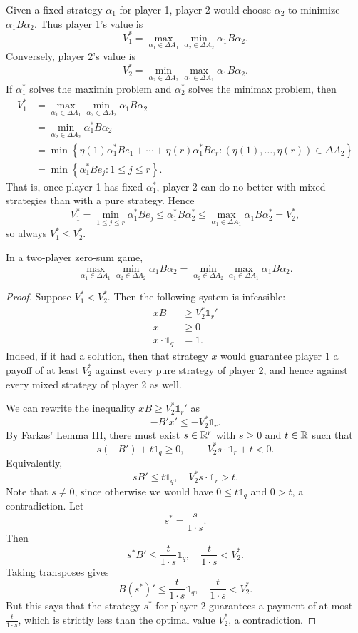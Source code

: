 Given a fixed strategy $\alpha_1$ for player 1, player 2 would choose $\alpha_2$ to minimize $\alpha_1 B \alpha_2$. Thus player 1's value is
\[
	V_1^* = \max_{\alpha_1 \in \Delta A_1} \min_{\alpha_2 \in \Delta A_2} \alpha_1 B \alpha_2
.\]
Conversely, player 2's value is
\[
	V_2^* = \min_{\alpha_2 \in \Delta A_2} \max_{\alpha_1 \in \Delta A_1} \alpha_1 B \alpha_2
.\]
If $\alpha_1^*$ solves the maximin problem and $\alpha_2^*$ solves the minimax problem, then
\begin{align*}
	V_1^*
	&= \max_{\alpha_1 \in \Delta A_1} \min_{\alpha_2 \in \Delta A_2} \alpha_1 B \alpha_2 \\
	&= \min_{\alpha_2 \in \Delta A_2} \alpha_1^* B \alpha_2 \\
	&= \min\left\{\eta(1)\alpha_1^* B e_1 + \cdots + \eta(r)\alpha_1^* B e_r : \left(\eta(1),\ldots,\eta(r)\right) \in \Delta A_2\right\} \\
	&= \min\left\{\alpha_1^* B e_j : 1 \le j \le r\right\}
.\end{align*}
That is, once player 1 has fixed $\alpha_1^*$, player 2 can do no better with mixed strategies than with a pure strategy. Hence
\[
	V_1^*
	= \min_{1\le j\le r} \alpha_1^* B e_j
	\le \alpha_1^* B \alpha_2^*
	\le \max_{\alpha_1 \in \Delta A_1} \alpha_1 B \alpha_2^*
	= V_2^*
,\]
so always $V_1^* \le V_2^*$.
\begin{theorem}[Minimax]
	In a two-player zero-sum game, \[
		\max_{\alpha_1 \in \Delta A_1} \min_{\alpha_2 \in \Delta A_2} \alpha_1 B \alpha_2
		=
		\min_{\alpha_2 \in \Delta A_2} \max_{\alpha_1 \in \Delta A_1} \alpha_1 B \alpha_2
	.\] 
\end{theorem}
\begin{proof}
	Suppose $V_1^* < V_2^*$. Then the following system is infeasible:
	\begin{align*}
		xB &\ge V_2^* \mathds{1}_r' \\
		x &\ge 0 \\
		x \cdot \mathds{1}_q &= 1
	.\end{align*}
	Indeed, if it had a solution, then that strategy $x$ would guarantee player 1 a payoff of at least $V_2^*$ against every pure strategy of player 2, and hence against every mixed strategy of player 2 as well.

	We can rewrite the inequality $xB \ge V_2^* \mathds{1}_r'$ as
	\[
		-B'x' \le -V_2^* \mathds{1}_r
	.\]
	By Farkas' Lemma III, there must exist $s \in \mathbb{R}^r$ with $s \ge 0$ and $t \in \mathbb{R}$ such that
	\[
		s(-B') + t\mathds{1}_q \ge 0, \quad -V_2^* s \cdot \mathds{1}_r + t < 0
	.\]
	Equivalently,
	\[
		sB' \le t\mathds{1}_q, \quad V_2^* s \cdot \mathds{1}_r > t
	.\]
	Note that $s \ne 0$, since otherwise we would have $0 \le t\mathds{1}_q$ and $0 > t$, a contradiction. Let
	\[
		s^* = \frac{s}{1 \cdot s}
	.\]
	Then
	\[
		s^* B' \le \frac{t}{1 \cdot s} \mathds{1}_q, \quad \frac{t}{1 \cdot s} < V_2^*
	.\]
	Taking transposes gives
	\[
		B(s^*)' \le \frac{t}{1 \cdot s} \mathds{1}_q, \quad \frac{t}{1 \cdot s} < V_2^*
	.\]
	But this says that the strategy $s^*$ for player 2 guarantees a payment of at most $\frac{t}{1 \cdot s}$, which is strictly less than the optimal value $V_2^*$, a contradiction.
\end{proof}

